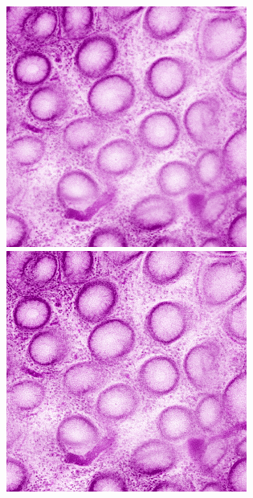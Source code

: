 \begin{figure}[H]
\begin{minipage}{0.24\columnwidth}
	\end{minipage}
	\begin{minipage}{0.24\columnwidth}
		\centering
		\includegraphics[clip, width=\linewidth]{fig/preprocessing/data_aug/color/SHARPNESS/SHARPNESS_1_00}
	\end{minipage}
	\begin{minipage}{0.24\columnwidth}
		\centering
		\includegraphics[clip, width=\linewidth]{fig/preprocessing/data_aug/color/SHARPNESS/SHARPNESS_2_00}
	\end{minipage}
	

\end{figure}
